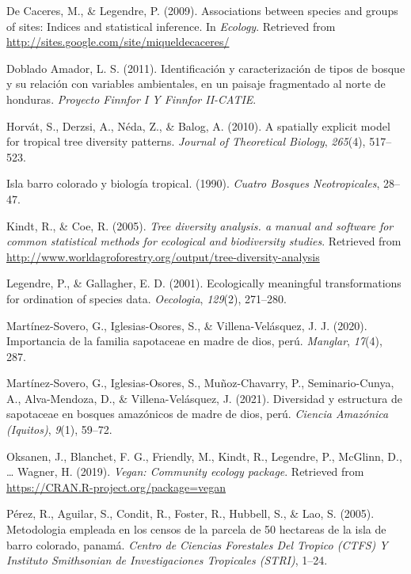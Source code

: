 \documentclass[11pt,]{article}
\begin{document}
\hypertarget{ref-indicspecies}{}
De Caceres, M., \& Legendre, P. (2009). Associations between species and
groups of sites: Indices and statistical inference. In \emph{Ecology}.
Retrieved from \url{http://sites.google.com/site/miqueldecaceres/}

\hypertarget{ref-doblado2011identificacion}{}
Doblado Amador, L. S. (2011). Identificación y caracterización de tipos
de bosque y su relación con variables ambientales, en un paisaje
fragmentado al norte de honduras. \emph{Proyecto Finnfor I Y Finnfor
II-CATIE}.

\hypertarget{ref-horvat2010spatially}{}
Horvát, S., Derzsi, A., Néda, Z., \& Balog, A. (2010). A spatially
explicit model for tropical tree diversity patterns. \emph{Journal of
Theoretical Biology}, \emph{265}(4), 517--523.

\hypertarget{ref-leigh1990barro}{}
Isla barro colorado y biología tropical. (1990). \emph{Cuatro Bosques
Neotropicales}, 28--47.

\hypertarget{ref-diversityanalysis}{}
Kindt, R., \& Coe, R. (2005). \emph{Tree diversity analysis. a manual
and software for common statistical methods for ecological and
biodiversity studies}. Retrieved from
\url{http://www.worldagroforestry.org/output/tree-diversity-analysis}

\hypertarget{ref-legendre2001ecologically}{}
Legendre, P., \& Gallagher, E. D. (2001). Ecologically meaningful
transformations for ordination of species data. \emph{Oecologia},
\emph{129}(2), 271--280.

\hypertarget{ref-martinez2020importancia}{}
Martínez-Sovero, G., Iglesias-Osores, S., \& Villena-Velásquez, J. J.
(2020). Importancia de la familia sapotaceae en madre de dios, perú.
\emph{Manglar}, \emph{17}(4), 287.

\hypertarget{ref-martinez2021diversidad}{}
Martínez-Sovero, G., Iglesias-Osores, S., Muñoz-Chavarry, P.,
Seminario-Cunya, A., Alva-Mendoza, D., \& Villena-Velásquez, J. (2021).
Diversidad y estructura de sapotaceae en bosques amazónicos de madre de
dios, perú. \emph{Ciencia Amazónica (Iquitos)}, \emph{9}(1), 59--72.

\hypertarget{ref-vegan}{}
Oksanen, J., Blanchet, F. G., Friendly, M., Kindt, R., Legendre, P.,
McGlinn, D., \ldots{} Wagner, H. (2019). \emph{Vegan: Community ecology
package}. Retrieved from \url{https://CRAN.R-project.org/package=vegan}

\hypertarget{ref-perez2005metodologia}{}
Pérez, R., Aguilar, S., Condit, R., Foster, R., Hubbell, S., \& Lao, S.
(2005). Metodologia empleada en los censos de la parcela de 50 hectareas
de la isla de barro colorado, panamá. \emph{Centro de Ciencias
Forestales Del Tropico (CTFS) Y Instituto Smithsonian de Investigaciones
Tropicales (STRI)}, 1--24.
\end{document}
